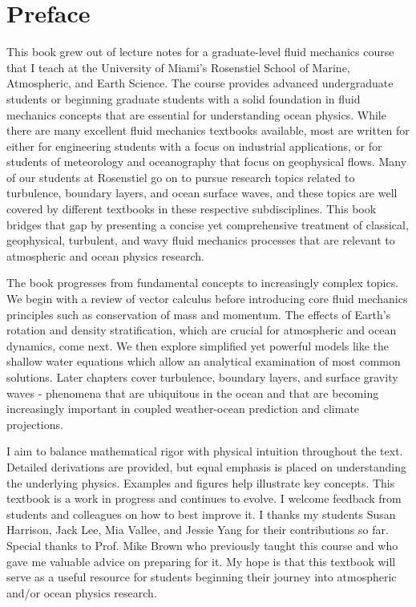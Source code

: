 \documentclass[12pt]{article}
\numberwithin{equation}{section}
\numberwithin{figure}{section}
\numberwithin{table}{section}
\begin{document}
\newpage
\section*{Preface}

This book grew out of lecture notes for a graduate-level fluid mechanics course
that I teach at the University of Miami's Rosenstiel School of Marine,
Atmospheric, and Earth Science.
The course provides advanced undergraduate students or beginning graduate
students with a solid foundation in fluid mechanics concepts that are essential
for understanding ocean physics.
While there are many excellent fluid mechanics textbooks available, most are
written for either for engineering students with a focus on industrial
applications, or for students of meteorology and oceanography that focus on
geophysical flows.
Many of our students at Rosenstiel go on to pursue research topics related to
turbulence, boundary layers, and ocean surface waves, and these topics are well
covered by different textbooks in these respective subdisciplines.
This book bridges that gap by presenting a concise yet comprehensive treatment
of classical, geophysical, turbulent, and wavy fluid mechanics processes
that are relevant to atmospheric and ocean physics research.

The book progresses from fundamental concepts to increasingly complex topics.
We begin with a review of vector calculus before introducing core fluid
mechanics principles such as conservation of mass and momentum.
The effects of Earth's rotation and density stratification,
which are crucial for atmospheric and ocean dynamics, come next.
We then explore simplified yet powerful models like the shallow water equations
which allow an analytical examination of most common solutions.
Later chapters cover turbulence, boundary layers, and surface gravity waves -
phenomena that are ubiquitous in the ocean and that are becoming increasingly
important in coupled weather-ocean prediction and climate projections.

I aim to balance mathematical rigor with physical intuition throughout the text.
Detailed derivations are provided, but equal emphasis is placed on
understanding the underlying physics.
Examples and figures help illustrate key concepts.
This textbook is a work in progress and continues to evolve.
I welcome feedback from students and colleagues on how to best improve it.
I thanks my students Susan Harrison, Jack Lee, Mia Vallee, and Jessie Yang for
their contributions so far.
Special thanks to Prof. Mike Brown who previously taught this course and who
gave me valuable advice on preparing for it.
My hope is that this textbook will serve as a useful resource for students
beginning their journey into atmospheric and/or ocean physics research.
\end{document}
